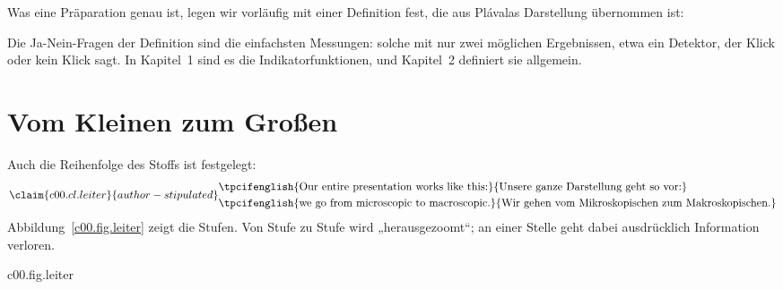Was eine Präparation genau ist, legen wir vorläufig mit einer Definition fest, die aus
Plávalas Darstellung übernommen ist:


Die Ja-Nein-Fragen der Definition sind die einfachsten Messungen: solche mit nur zwei
möglichen Ergebnissen, etwa ein Detektor, der Klick oder kein Klick sagt. In Kapitel~1 sind
es die Indikatorfunktionen, und Kapitel~2 definiert sie allgemein.

\section{Vom Kleinen zum Großen}\label{c00.s3}

Auch die Reihenfolge des Stoffs ist festgelegt:
\begin{equation}\label{c00.eq.leiter}\claim{c00.cl.leiter}{author-stipulated}
  \begin{aligned}
    &\text{\tpcifenglish{Our entire presentation works like this:}{Unsere ganze Darstellung geht so vor:}} \\
    &\text{\tpcifenglish{we go from microscopic to macroscopic.}{Wir gehen vom Mikroskopischen zum Makroskopischen.}}
  \end{aligned}
\end{equation}
Abbildung~\ref{c00.fig.leiter} zeigt die Stufen. Von Stufe zu Stufe wird „herausgezoomt“; an
einer Stelle geht dabei ausdrücklich Information verloren.

\begin{tpcfigure}{c00.fig.leiter}
  \caption{Die Leiter der Theorien dieses Kurses, von unten (mikroskopisch) nach oben
    (makroskopisch). Die Beschriftungen der sechs Stufen und der fünf Pfeile sind
    ausgewählte Auszüge aus der Festlegung, auf die sich Satz~\eqref{c00.eq.leiter}
    bezieht. Die letzte Stufe heißt dort vollständig „Thermodynamik als die ultimative
    effektive Theorie der gesamten Physik auf makroskopischer Skala“. GPT steht für
    „general probabilistic theory“, QM für Quantenmechanik. Der Kurs beginnt unten:
    Kapitel~1 und~2 behandeln Stufe~1.}
\end{tpcfigure}

